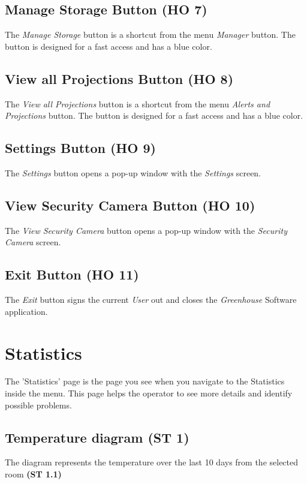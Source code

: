 \subsection{Manage Storage Button (HO 7)}
The \emph{Manage Storage} button is a shortcut from the menu
\emph{Manager} button. The button is designed for a fast access and has a blue
color.

\subsection{View all Projections Button (HO 8)}
The \emph{View all Projections} button is a shortcut from the menu
\emph{Alerts and Projections} button. The button is designed for a fast access
and has a blue color.

\subsection{Settings Button (HO 9)}
The \emph{Settings} button opens a pop-up window with the \emph{Settings}
screen.

\subsection{View Security Camera Button (HO 10)}
The \emph{View Security Camera} button opens a pop-up window with the
\emph{Security Camera} screen.

\subsection{Exit Button (HO 11)}
The \emph{Exit} button signs the current \emph{User} out and closes the
\emph{Greenhouse} Software application.


\newpage
\section{Statistics}
\label{sec:appendix_Statistics}
\mbox{} \par
\noindent{}

The 'Statistics' page is the  page you see when you navigate to the Statistics
inside the menu. This page helps the operator to see more details and identify
possible problems.

\subsection{Temperature diagram (ST 1)}
The diagram represents the temperature over the last 10 days from the selected
room \textbf{(ST 1.1)}

